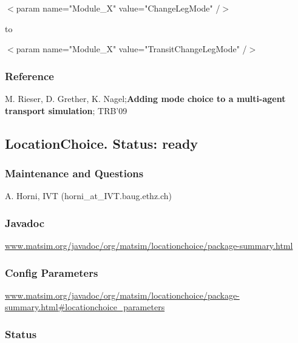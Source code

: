 $<$param name="Module\_X" value="ChangeLegMode" /$>$

to

$<$param name="Module\_X" value="TransitChangeLegMode" /$>$

\subsubsection{Reference}

M. Rieser, D. Grether, K. Nagel;\textbf{Adding mode choice to a multi-agent transport simulation}; TRB'09

\subsection{LocationChoice. Status: ready}

\subsubsection{{Maintenance and Questions}}

A. Horni, IVT (horni\_at\_IVT.baug.ethz.ch)

\subsubsection{{Javadoc}}

\href{http://www.matsim.org/javadoc/org/matsim/locationchoice/package-summary.html}{www.matsim.org/javadoc/org/matsim/locationchoice/package-summary.html}



\subsubsection{Config Parameters}


\href{http://www.matsim.org/javadoc/org/matsim/locationchoice/package-summary.html#locationchoice_parameters}{www.matsim.org/javadoc/org/matsim/locationchoice/package-summary.html\#locationchoice\_parameters}



\subsubsection{{Status}}

